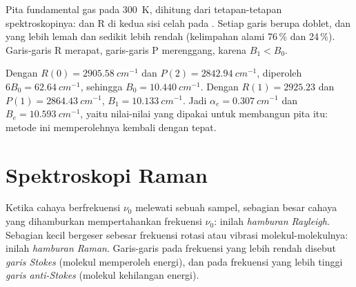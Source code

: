 \begin{omfigure}

{\small Pita fundamental gas  pada \qty{300}{K}, dihitung dari
tetapan-tetapan spektroskopinya:  dan R di kedua sisi celah pada . Setiap garis berupa doblet,  dan  yang lebih
lemah dan sedikit lebih rendah (kelimpahan alami 76\,\% dan 24\,\%). Garis-garis
R merapat, garis-garis P merenggang, karena $B_1 < B_0$.}
\end{omfigure}

\begin{example}\label{ex:b3:rovibrational-spectroscopy:analysis}
Dengan $R(0) = \qty{2905.58}{cm^{-1}}$ dan $P(2) = \qty{2842.94}{cm^{-1}}$,
diperoleh $6B_0 = \qty{62.64}{cm^{-1}}$, sehingga $B_0 = \qty{10.440}{cm^{-1}}$.
Dengan $R(1) = 2925.23$ dan $P(1) =
\qty{2864.43}{cm^{-1}}$,
$B_1 = \qty{10.133}{cm^{-1}}$. Jadi $\alpha_e = \qty{0.307}{cm^{-1}}$ dan
$B_e = \qty{10.593}{cm^{-1}}$, yaitu nilai-nilai yang dipakai untuk membangun
pita itu: metode ini memperolehnya kembali dengan tepat.
\end{example}

\section{Spektroskopi Raman}

\begin{definition}\label{def:b3:rovibrational-spectroscopy:raman}
Ketika cahaya berfrekuensi $\nu_0$ melewati sebuah sampel, sebagian besar
cahaya yang dihamburkan mempertahankan frekuensi $\nu_0$: inilah
\emph{hamburan Rayleigh}. Sebagian kecil bergeser
sebesar frekuensi rotasi atau vibrasi molekul-molekulnya: inilah
\emph{hamburan Raman}. Garis-garis pada frekuensi yang
lebih rendah disebut \emph{garis Stokes} (molekul
memperoleh energi), dan pada frekuensi yang lebih tinggi \emph{garis
anti-Stokes} (molekul kehilangan energi).
\end{definition}

